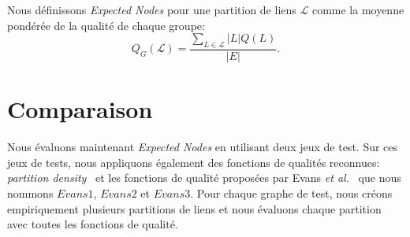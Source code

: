 Nous définissons \emph{Expected Nodes} pour une partition de liens $\mathcal{L}$ comme la moyenne pondérée de la qualité de chaque groupe:
\begin{equation}
\label{eq:qualite_globale} Q_G(\mathcal{L}) = \dfrac{\sum_{L\in \mathcal{L}} |L|Q(L)}{|E|}.
\end{equation}



\section{Comparaison}

Nous évaluons maintenant \emph{Expected Nodes} en utilisant deux jeux de test.
Sur ces jeux de tests, nous appliquons également des fonctions de qualités reconnues:
\emph{partition density}~\cite{Ahn2010a} et les fonctions de qualité proposées par Evans \emph{et al.}~\cite{Evans2009} que nous nommons $Evans1$, $Evans2$ et $Evans3$.
Pour chaque graphe de test, nous créons empiriquement plusieurs partitions de liens et nous évaluons chaque partition avec toutes les fonctions de qualité.

